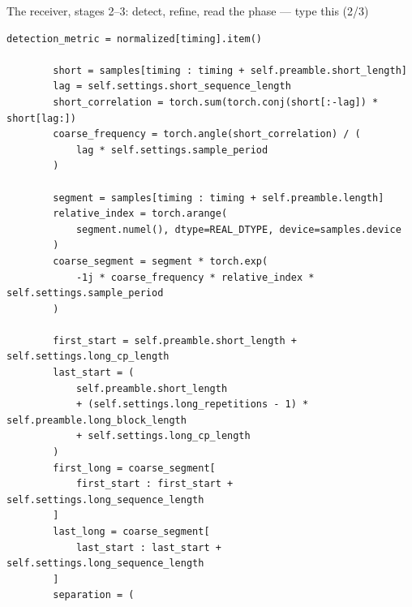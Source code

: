 \documentclass[10pt]{beamer}
\begin{document}
\begin{frame}[fragile]{The receiver, stages 2--3: detect, refine, read the phase --- type this (2/3)}
\begin{lstlisting}[basicstyle=\ttfamily\tiny]
        detection_metric = normalized[timing].item()

        short = samples[timing : timing + self.preamble.short_length]
        lag = self.settings.short_sequence_length
        short_correlation = torch.sum(torch.conj(short[:-lag]) * short[lag:])
        coarse_frequency = torch.angle(short_correlation) / (
            lag * self.settings.sample_period
        )

        segment = samples[timing : timing + self.preamble.length]
        relative_index = torch.arange(
            segment.numel(), dtype=REAL_DTYPE, device=samples.device
        )
        coarse_segment = segment * torch.exp(
            -1j * coarse_frequency * relative_index * self.settings.sample_period
        )

        first_start = self.preamble.short_length + self.settings.long_cp_length
        last_start = (
            self.preamble.short_length
            + (self.settings.long_repetitions - 1) * self.preamble.long_block_length
            + self.settings.long_cp_length
        )
        first_long = coarse_segment[
            first_start : first_start + self.settings.long_sequence_length
        ]
        last_long = coarse_segment[
            last_start : last_start + self.settings.long_sequence_length
        ]
        separation = (
\end{lstlisting}
\end{frame}
\end{document}
